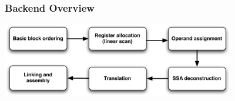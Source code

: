 \begin{frame}
\frametitle{\bf Backend Overview}

\begin{center}
\includegraphics[width=4in]{images/backend}
\end{center}
\end{frame}

% 

